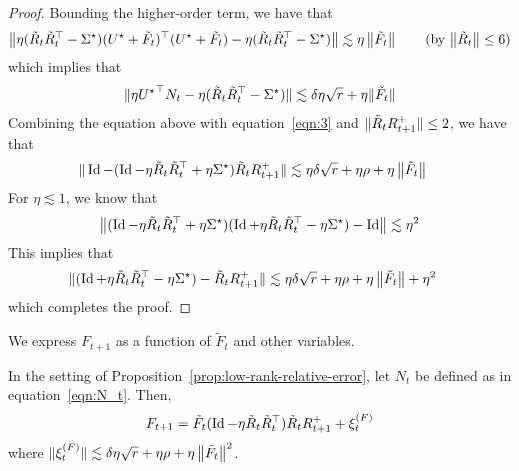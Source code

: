 \begin{proof}
Bounding the higher-order term, we have that 
\begin{align*}
\Norm{\eta (\tilde{R}_t\tilde{R}_t^\top-\bSigmag)(\bUg+\tilde{F}_t)^\top (\bUg + \tilde{F}_t)- \eta (\tilde{R}_t\tilde{R}_t^\top-\bSigmag)}\lesssim \eta \Norm{\tilde{F}_t} \tag{by $\Norm{\tilde{R}_t}\le 6$}
\end{align*}
which implies that 
\begin{align}
 \|\eta{{U}^\star}^\top N_t -\eta (\tilde{R}_t\tilde{R}_t^\top-{{\Sigma}^\star})\| \lesssim \delta \eta \sqrt{r} + \eta \|\tilde{F}_t\|\label{eqn:2}
\end{align}
Combining the equation above with equation~\eqref{eqn:3} and $\|\tilde{R}_tR_{t+1}^+\|\le 2$, we have that 
	\begin{align}
\|\operatorname{Id} - (\operatorname{Id} - \eta \tilde{R}_t\tilde{R}_t^\top + \eta {{\Sigma}^\star}) \tilde{R}_tR_{t+1}^+\|& \lesssim \eta\delta\sqrt{r}  + \eta \rho + \eta\left\|\tilde{F}_t\right\| \label{eqn:21}
\end{align}
For $\eta \lesssim 1$, we know that 
\begin{align*}
\left\|(\operatorname{Id} - \eta \tilde{R}_t\tilde{R}_t^\top + \eta {{\Sigma}^\star})  (\operatorname{Id} + \eta \tilde{R}_t\tilde{R}_t^\top - \eta {{\Sigma}^\star}) - \operatorname{Id}  \right\| \lesssim \eta^2 
\end{align*}
This implies that 
\begin{align*}
\|(\operatorname{Id} + \eta \tilde{R}_t\tilde{R}_t^\top - \eta {{\Sigma}^\star}) - \tilde{R}_tR_{t+1}^+\|& \lesssim \eta\delta\sqrt{r} + \eta \rho + \eta\left\|\tilde{F}_t\right\| + \eta^2  
\end{align*}
which completes the proof. 
\end{proof}



We express $F_{t+1}$ as a function of $\tilde{F}_t$ and other variables. 
\begin{lem}\label{lem:FtFtplus1}
In the setting of Proposition~\ref{prop:low-rank-relative-error}, let $N_t$ be defined as in equation~\eqref{eqn:N_t}. Then, 
\begin{align*}
F_{t+1} = \tilde{F}_t(\operatorname{Id} -\eta \tilde{R}_t\tilde{R}_t^\top )\tilde{R}_tR_{t+1}^{+} + \xi_t^{(F)}
\end{align*}	
where 
$
\|\xi_t^{(F)}\|\lesssim \delta\eta\sqrt{r} + \eta  \rho+ \eta \left\|\tilde{F}_t\right\|^2
$.
\end{lem}

